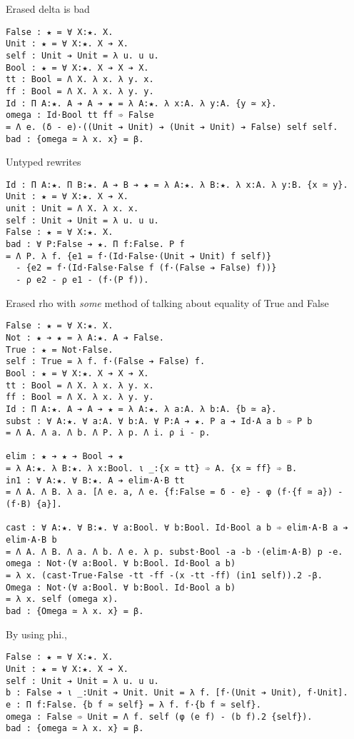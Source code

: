 \begin{verbatim}
\end{verbatim}


Erased delta is bad
\begin{verbatim}
False : ★ = ∀ X:★. X.
Unit : ★ = ∀ X:★. X ➔ X.
self : Unit ➔ Unit = λ u. u u.
Bool : ★ = ∀ X:★. X ➔ X ➔ X.
tt : Bool = Λ X. λ x. λ y. x.
ff : Bool = Λ X. λ x. λ y. y.
Id : Π A:★. A ➔ A ➔ ★ = λ A:★. λ x:A. λ y:A. {y ≃ x}.
omega : Id·Bool tt ff ➾ False
= Λ e. (δ - e)·((Unit ➔ Unit) ➔ (Unit ➔ Unit) ➔ False) self self.
bad : {omega ≃ λ x. x} = β.
\end{verbatim}

Untyped rewrites
\begin{verbatim}
Id : Π A:★. Π B:★. A ➔ B ➔ ★ = λ A:★. λ B:★. λ x:A. λ y:B. {x ≃ y}.
Unit : ★ = ∀ X:★. X ➔ X.
unit : Unit = Λ X. λ x. x.
self : Unit ➔ Unit = λ u. u u.
False : ★ = ∀ X:★. X.
bad : ∀ P:False ➔ ★. Π f:False. P f
= Λ P. λ f. {e1 = f·(Id·False·(Unit ➔ Unit) f self)}
  - {e2 = f·(Id·False·False f (f·(False ➔ False) f))}
  - ρ e2 - ρ e1 - (f·(P f)).
\end{verbatim}

Erased rho with \textit{some} method of talking about equality of True and False
\begin{verbatim}
False : ★ = ∀ X:★. X.
Not : ★ ➔ ★ = λ A:★. A ➔ False.
True : ★ = Not·False.
self : True = λ f. f·(False ➔ False) f.
Bool : ★ = ∀ X:★. X ➔ X ➔ X.
tt : Bool = Λ X. λ x. λ y. x.
ff : Bool = Λ X. λ x. λ y. y.
Id : Π A:★. A ➔ A ➔ ★ = λ A:★. λ a:A. λ b:A. {b ≃ a}.
subst : ∀ A:★. ∀ a:A. ∀ b:A. ∀ P:A ➔ ★. P a ➔ Id·A a b ➾ P b
= Λ A. Λ a. Λ b. Λ P. λ p. Λ i. ρ i - p.

elim : ★ ➔ ★ ➔ Bool ➔ ★
= λ A:★. λ B:★. λ x:Bool. ι _:{x ≃ tt} ➾ A. {x ≃ ff} ➾ B.
in1 : ∀ A:★. ∀ B:★. A ➔ elim·A·B tt
= Λ A. Λ B. λ a. [Λ e. a, Λ e. {f:False = δ - e} - φ (f·{f ≃ a}) - (f·B) {a}].

cast : ∀ A:★. ∀ B:★. ∀ a:Bool. ∀ b:Bool. Id·Bool a b ➾ elim·A·B a ➔ elim·A·B b
= Λ A. Λ B. Λ a. Λ b. Λ e. λ p. subst·Bool -a -b ·(elim·A·B) p -e.
omega : Not·(∀ a:Bool. ∀ b:Bool. Id·Bool a b)
= λ x. (cast·True·False -tt -ff -(x -tt -ff) (in1 self)).2 -β.
Omega : Not·(∀ a:Bool. ∀ b:Bool. Id·Bool a b)
= λ x. self (omega x).
bad : {Omega ≃ λ x. x} = β.
\end{verbatim}

By using phi.,

\begin{verbatim}
False : ★ = ∀ X:★. X.
Unit : ★ = ∀ X:★. X ➔ X.
self : Unit ➔ Unit = λ u. u u.
b : False ➔ ι _:Unit ➔ Unit. Unit = λ f. [f·(Unit ➔ Unit), f·Unit].
e : Π f:False. {b f ≃ self} = λ f. f·{b f ≃ self}.
omega : False ➾ Unit = Λ f. self (φ (e f) - (b f).2 {self}).
bad : {omega ≃ λ x. x} = β.
\end{verbatim}

